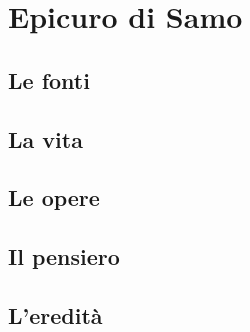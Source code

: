 \chapter{Epicuro di Samo}

\section{Le fonti}

\section{La vita}

\section{Le opere}

\section{Il pensiero}

\section{L'eredità}
